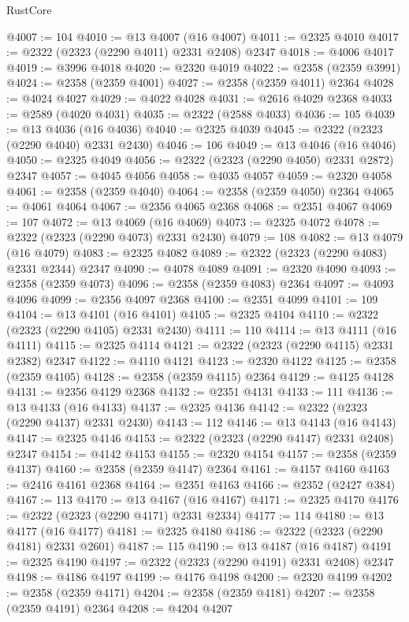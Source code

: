 \begin{lexlean}{RustCore}
\begin{coremodule}
@4007 := 104
@4010 := @13 @4007 (@16 @4007)
@4011 := @2325 @4010
@4017 := @2322 (@2323 (@2290 @4011) @2331 @2408) @2347
@4018 := @4006 @4017
@4019 := @3996 @4018
@4020 := @2320 @4019
@4022 := @2358 (@2359 @3991)
@4024 := @2358 (@2359 @4001)
@4027 := @2358 (@2359 @4011) @2364
@4028 := @4024 @4027
@4029 := @4022 @4028
@4031 := @2616 @4029 @2368
@4033 := @2589 (@4020 @4031)
@4035 := @2322 (@2588 @4033)
@4036 := 105
@4039 := @13 @4036 (@16 @4036)
@4040 := @2325 @4039
@4045 := @2322 (@2323 (@2290 @4040) @2331 @2430)
@4046 := 106
@4049 := @13 @4046 (@16 @4046)
@4050 := @2325 @4049
@4056 := @2322 (@2323 (@2290 @4050) @2331 @2872) @2347
@4057 := @4045 @4056
@4058 := @4035 @4057
@4059 := @2320 @4058
@4061 := @2358 (@2359 @4040)
@4064 := @2358 (@2359 @4050) @2364
@4065 := @4061 @4064
@4067 := @2356 @4065 @2368
@4068 := @2351 @4067
@4069 := 107
@4072 := @13 @4069 (@16 @4069)
@4073 := @2325 @4072
@4078 := @2322 (@2323 (@2290 @4073) @2331 @2430)
@4079 := 108
@4082 := @13 @4079 (@16 @4079)
@4083 := @2325 @4082
@4089 := @2322 (@2323 (@2290 @4083) @2331 @2344) @2347
@4090 := @4078 @4089
@4091 := @2320 @4090
@4093 := @2358 (@2359 @4073)
@4096 := @2358 (@2359 @4083) @2364
@4097 := @4093 @4096
@4099 := @2356 @4097 @2368
@4100 := @2351 @4099
@4101 := 109
@4104 := @13 @4101 (@16 @4101)
@4105 := @2325 @4104
@4110 := @2322 (@2323 (@2290 @4105) @2331 @2430)
@4111 := 110
@4114 := @13 @4111 (@16 @4111)
@4115 := @2325 @4114
@4121 := @2322 (@2323 (@2290 @4115) @2331 @2382) @2347
@4122 := @4110 @4121
@4123 := @2320 @4122
@4125 := @2358 (@2359 @4105)
@4128 := @2358 (@2359 @4115) @2364
@4129 := @4125 @4128
@4131 := @2356 @4129 @2368
@4132 := @2351 @4131
@4133 := 111
@4136 := @13 @4133 (@16 @4133)
@4137 := @2325 @4136
@4142 := @2322 (@2323 (@2290 @4137) @2331 @2430)
@4143 := 112
@4146 := @13 @4143 (@16 @4143)
@4147 := @2325 @4146
@4153 := @2322 (@2323 (@2290 @4147) @2331 @2408) @2347
@4154 := @4142 @4153
@4155 := @2320 @4154
@4157 := @2358 (@2359 @4137)
@4160 := @2358 (@2359 @4147) @2364
@4161 := @4157 @4160
@4163 := @2416 @4161 @2368
@4164 := @2351 @4163
@4166 := @2352 (@2427 @384)
@4167 := 113
@4170 := @13 @4167 (@16 @4167)
@4171 := @2325 @4170
@4176 := @2322 (@2323 (@2290 @4171) @2331 @2334)
@4177 := 114
@4180 := @13 @4177 (@16 @4177)
@4181 := @2325 @4180
@4186 := @2322 (@2323 (@2290 @4181) @2331 @2601)
@4187 := 115
@4190 := @13 @4187 (@16 @4187)
@4191 := @2325 @4190
@4197 := @2322 (@2323 (@2290 @4191) @2331 @2408) @2347
@4198 := @4186 @4197
@4199 := @4176 @4198
@4200 := @2320 @4199
@4202 := @2358 (@2359 @4171)
@4204 := @2358 (@2359 @4181)
@4207 := @2358 (@2359 @4191) @2364
@4208 := @4204 @4207

\end{coremodule}
\end{lexlean}
